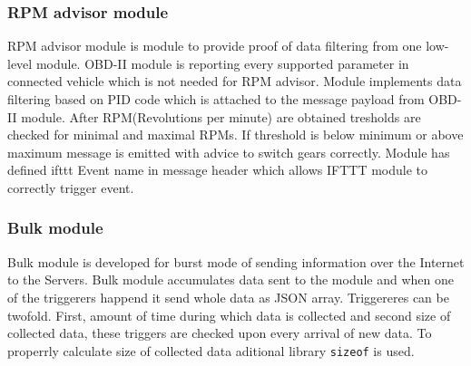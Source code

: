 \subsubsection{RPM advisor module} %
\label{ssub:rpm_advisor_module}
RPM advisor module is module to provide proof of data filtering from one low-level module. OBD-II module is reporting every supported parameter in connected vehicle which is not needed for RPM advisor. Module implements data filtering based on PID code which is attached to the message payload from OBD-II module. After RPM(Revolutions per minute) are obtained tresholds are checked for minimal and maximal RPMs. If threshold is below minimum or above maximum message is emitted with advice to switch gears correctly. Module has defined ifttt Event name in message header which allows IFTTT module to correctly trigger event.

\subsubsection{Bulk module} %
\label{ssub:bulk_module}
Bulk module is developed for burst mode of sending information over the Internet to the Servers. Bulk module accumulates data sent to the module and when one of the triggerers happend it send whole data as JSON array. Triggereres can be twofold. First, amount of time during which data is collected and second size of collected data, these triggers are checked upon every arrival of new data. To properrly calculate size of collected data aditional library \verb|sizeof| is used.
